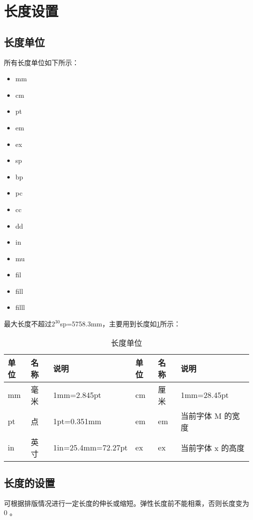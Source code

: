 \section{长度设置}
\subsection{长度单位}
所有长度单位如下所示：\\
\begin{itemize}
  \item mm \item cm
  \item pt \item em \item ex
  \item sp \item bp \item pc
  \item cc \item dd \item in
  \item mu \item fil \item fill \item filll
\end{itemize}

最大长度不超过$2^{30}$sp=5758.3mm，主要用到长度如\ref{length}所示：\\
\begin{table}[htbp]
  \centering
  \caption{长度单位}\label{length}
\begin{tabular}{llllll}
  \toprule
  单位 & 名称 & 说明 & 单位 & 名称 & 说明 \\
  \midrule
  mm & 毫米 & 1mm=2.845pt  & cm & 厘米 & 1mm=28.45pt \\
  pt & 点 & 1pt=0.351mm & em & em & 当前字体 M 的宽度 \\
  in & 英寸 & 1in=25.4mm=72.27pt & ex & ex & 当前字体 x 的高度 \\
  \bottomrule
\end{tabular}
\end{table}

\subsection{长度的设置}
可根据排版情况进行一定长度的伸长或缩短。弹性长度前不能相乘，否则长度变为 0 。\\

